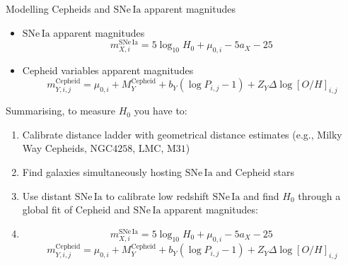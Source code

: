 \documentclass{beamer}
\newcommand{\LMC}{\mathrm{LMC}}
\newcommand{\MW}{\mathrm{MW}}
\newcommand{\Cepheid}{\mathrm{Cepheid}}
\newcommand{\SNe}{\mathrm{SNe\,Ia}}
\newcommand{\MAnd}{\mathrm{M31}}
\newcommand{\NGC}{\mathrm{NGC4258}}
\begin{document}
\begin{frame}{Modelling Cepheids and $\SNe$ apparent magnitudes}
\begin{itemize}
\item $\SNe$ apparent magnitudes
\begin{equation*}
m_{X,i}^{\SNe} =  5 \log_{10} H_0 + \mu_{0,i} - 5 a_X - 25 \, %
\end{equation*}
\item Cepheid variables apparent magnitudes 
\begin{equation*}\label{Eq:P-L-equation}
m_{Y,i,j}^{\Cepheid} = \mu_{0,i} + M_Y^{\Cepheid} + b_Y (\log P_{i,j}-1) + Z_Y \Delta \log[O/H]_{i,j}%
\end{equation*}
\end{itemize}
\end{frame}

\begin{frame}{Summarising, to measure $H_0$ you have to:}
\begin{enumerate}
\item Calibrate distance ladder with geometrical distance estimates (e.g., Milky Way Cepheids, $\NGC$, $\LMC$, $\MAnd$)
\item Find galaxies simultaneously hosting $\SNe$ and Cepheid stars
\item Use distant $\SNe$ to calibrate low redshift $\SNe$ and find $H_0$ through a global fit of Cepheid and $\SNe$ apparent magnitudes:
\item[]
\begin{equation*}
m_{X,i}^{\SNe} =  5 \log_{10} H_0 + \mu_{0,i} - 5 a_X - 25 \, %
\end{equation*}
\begin{equation*}\label{Eq:P-L-equation}
m_{Y,i,j}^{\Cepheid} = \mu_{0,i} + M_Y^{\Cepheid} + b_Y (\log P_{i,j}-1) + Z_Y \Delta \log[O/H]_{i,j}%
\end{equation*}
\end{enumerate}
\end{frame}
\end{document}
